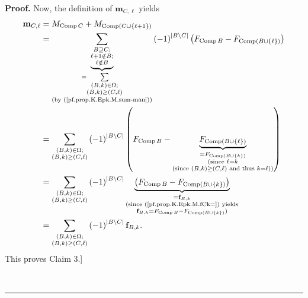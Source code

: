 \documentclass[numbers=enddot,12pt,final,onecolumn,notitlepage]{scrartcl}%
\theoremstyle{definition}
\newenvironment{proof}[1][Proof]{\noindent\textbf{#1.} }{\ \rule{0.5em}{0.5em}}
\let\sumnonlimits\sum
\renewcommand{\sum}{\sumnonlimits\limits}
\begin{document}
\begin{proof}
Now, the definition of $\mathbf{m}_{C,\ell}$ yields%
\begin{align*}
\mathbf{m}_{C,\ell}  &  =M_{\operatorname*{Comp}C}+M_{\operatorname*{Comp}%
\left(  C\cup\left\{  \ell+1\right\}  \right)  }\\
&  =\underbrace{\sum_{\substack{B\supseteq C;\\\ell+1\notin B;\\\ell\notin
B}}}_{\substack{=\sum_{\substack{\left(  B,k\right)  \in\Omega;\\\left(
B,k\right)  \geq\left(  C,\ell\right)  }}\\\text{(by
(\ref{pf.prop.K.Epk.M.sum-man}))}}}\left(  -1\right)  ^{\left\vert B\setminus
C\right\vert }\left(  F_{\operatorname*{Comp}B}-F_{\operatorname*{Comp}\left(
B\cup\left\{  \ell\right\}  \right)  }\right) \\
&  =\sum_{\substack{\left(  B,k\right)  \in\Omega;\\\left(  B,k\right)
\geq\left(  C,\ell\right)  }}\left(  -1\right)  ^{\left\vert B\setminus
C\right\vert }\left(  F_{\operatorname*{Comp}B}%
-\underbrace{F_{\operatorname*{Comp}\left(  B\cup\left\{  \ell\right\}
\right)  }}_{\substack{=F_{\operatorname*{Comp}\left(  B\cup\left\{
k\right\}  \right)  }\\\text{(since }\ell=k\\\text{(since }\left(  B,k\right)
\geq\left(  C,\ell\right)  \text{ and thus }k=\ell\text{))}}}\right) \\
&  =\sum_{\substack{\left(  B,k\right)  \in\Omega;\\\left(  B,k\right)
\geq\left(  C,\ell\right)  }}\left(  -1\right)  ^{\left\vert B\setminus
C\right\vert }\underbrace{\left(  F_{\operatorname*{Comp}B}%
-F_{\operatorname*{Comp}\left(  B\cup\left\{  k\right\}  \right)  }\right)
}_{\substack{=\mathbf{f}_{B,k}\\\text{(since (\ref{pf.prop.K.Epk.M.fCk=})
yields}\\\mathbf{f}_{B,k}=F_{\operatorname*{Comp}B}-F_{\operatorname*{Comp}%
\left(  B\cup\left\{  k\right\}  \right)  }\text{)}}}\\
&  =\sum_{\substack{\left(  B,k\right)  \in\Omega;\\\left(  B,k\right)
\geq\left(  C,\ell\right)  }}\left(  -1\right)  ^{\left\vert B\setminus
C\right\vert }\mathbf{f}_{B,k}.
\end{align*}
This proves Claim 3.]


\end{proof}
\end{document}
